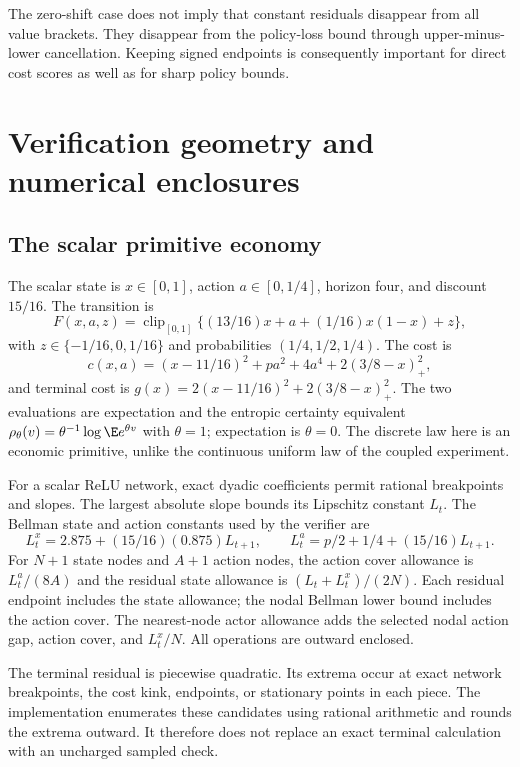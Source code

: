 \documentclass[ecta,nameyear,draft]{econsocart}
\begin{document}
The zero-shift case does not imply that constant residuals disappear from all value brackets. They disappear from the policy-loss bound through upper-minus-lower cancellation. Keeping signed endpoints is consequently important for direct cost scores as well as for sharp policy bounds.

\section{Verification geometry and numerical enclosures}
\subsection{The scalar primitive economy}
The scalar state is $x\in[0,1]$, action $a\in[0,1/4]$, horizon four, and discount $15/16$. The transition is
\[
 F(x,a,z)=\operatorname{clip}_{[0,1]}
       \{(13/16)x+a+(1/16)x(1-x)+z\},
\]
with $z\in\{-1/16,0,1/16\}$ and probabilities $(1/4,1/2,1/4)$. The cost is
\[
 c(x,a)=(x-11/16)^2+pa^2+4a^4+2(3/8-x)_+^2,
\]
and terminal cost is $g(x)=2(x-11/16)^2+2(3/8-x)_+^2$. The two evaluations are expectation and the entropic certainty equivalent $\rho_\theta(v)=\theta^{-1}\log\E e^{\theta v}$ with $\theta=1$; expectation is $\theta=0$. The discrete law here is an economic primitive, unlike the continuous uniform law of the coupled experiment.

For a scalar ReLU network, exact dyadic coefficients permit rational breakpoints and slopes. The largest absolute slope bounds its Lipschitz constant $L_t$. The Bellman state and action constants used by the verifier are
\[
 L_t^x=2.875+(15/16)(0.875)L_{t+1},\qquad
 L_t^a=p/2+1/4+(15/16)L_{t+1}.
\]
For $N+1$ state nodes and $A+1$ action nodes, the action cover allowance is $L_t^a/(8A)$ and the residual state allowance is $(L_t+L_t^x)/(2N)$. Each residual endpoint includes the state allowance; the nodal Bellman lower bound includes the action cover. The nearest-node actor allowance adds the selected nodal action gap, action cover, and $L_t^x/N$. All operations are outward enclosed.

The terminal residual is piecewise quadratic. Its extrema occur at exact network breakpoints, the cost kink, endpoints, or stationary points in each piece. The implementation enumerates these candidates using rational arithmetic and rounds the extrema outward. It therefore does not replace an exact terminal calculation with an uncharged sampled check.
\end{document}

